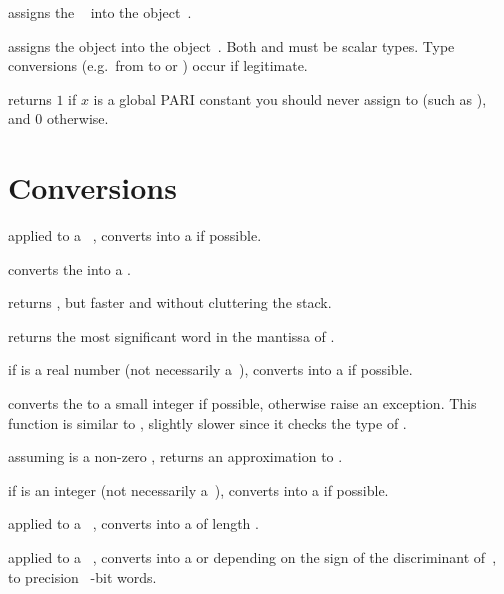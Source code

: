  assigns the ~ into the
object~.

 assigns the object  into the
object~. Both  and  must be scalar types. Type
conversions (e.g.~from  to  or ) occur if
legitimate.

 returns $1$ if $x$ is a global PARI constant
you should never assign to (such as ), and $0$ otherwise.

\section{Conversions}


 applied to a ~, converts 
into a  if possible.

 converts the   into a
.

 returns , but
faster and without cluttering the stack.

 returns the most significant word
in the mantissa of .

 if  is a real number (not necessarily
a~), converts  into a  if possible.

 converts the   to a small
integer if possible, otherwise raise an exception. This function
is similar to , slightly slower since it checks the type of .

 assuming  is a non-zero ,
returns an approximation to .

 if  is an integer (not necessarily
a~), converts  into a  if possible.

 applied to a ~, converts
 into a  of length .

 applied to a ~, converts
 into a  or  depending on the sign of the
discriminant of~, to precision \hbox{ \B-bit} words.

